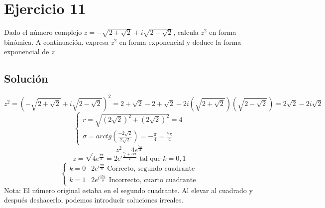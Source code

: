 \documentclass[fleqn]{article}
\begin{document}
 	\section{Ejercicio 11}
 	Dado el número complejo $z = -\sqrt{2+\sqrt{2}} + i\sqrt{2-\sqrt{2}}$, calcula $z^{2}$ en forma binómica. A continuación, expresa $z^{2}$ en forma exponencial y deduce la forma exponencial de $z$
 	\subsection{Solución}
 	 \[
 	 z^{2} = (-\sqrt{2+\sqrt{2}} + i\sqrt{2-\sqrt{2}})^{2} = 2 + \sqrt{2} - 2 + \sqrt{2} - 2i(\sqrt{2+\sqrt{2}})(\sqrt{2-\sqrt{2}}) = \boxed{2\sqrt{2} - 2i\sqrt{2}}
 	 \]
 	 \[
 	 \begin{cases}
 	 	r = \sqrt{(2\sqrt{2})^{2} + (2\sqrt{2})^{2}} = 4 \\
 	 	\sigma = arctg(\frac{-2\sqrt{2}}{2\sqrt{2}}) = -\frac{\pi}{4} = \frac{7\pi}{4}
 	 \end{cases}
 	 \]
 	 \[
 	 z^{2} = 4e^{\frac{7\pi}{4}}
 	 \]
 	 \[
 	 z = \sqrt{4e^{\frac{7\pi}{4}}} = 2e^{i\frac{\frac{7\pi}{4}+ 2k\pi}{2}} \text{ tal que } k = 0,1
 	 \]
 	 \[
 	 \begin{cases}
 	 	k = 0 & 2e^{i\frac{7\pi}{8}} \text{ Correcto, segundo cuadrante} \\
 	 	k = 1 & 2e^{i\frac{15\pi}{8}} \text{ Incorrecto, cuarto cuadrante}
 	 \end{cases}
 	 \]
 	 Nota: El número original estaba en el segundo cuadrante. Al elevar al cuadrado y después deshacerlo, podemos introducir soluciones irreales.
\end{document}
